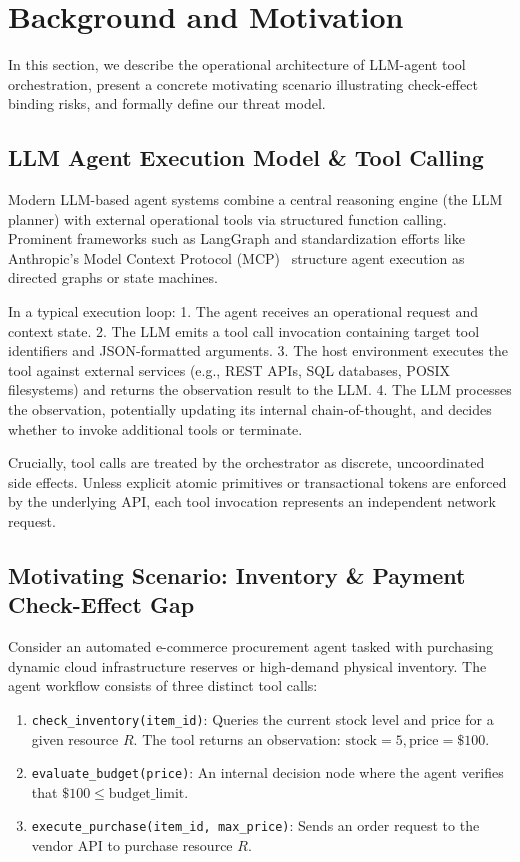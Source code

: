 \section{Background and Motivation}
\label{sec:background}

In this section, we describe the operational architecture of LLM-agent tool orchestration, present a concrete motivating scenario illustrating check-effect binding risks, and formally define our threat model.

\subsection{LLM Agent Execution Model \& Tool Calling}
Modern LLM-based agent systems combine a central reasoning engine (the LLM planner) with external operational tools via structured function calling. Prominent frameworks such as LangGraph and standardization efforts like Anthropic's Model Context Protocol (MCP)~\cite{mcp2024spec} structure agent execution as directed graphs or state machines. 

In a typical execution loop:
1. The agent receives an operational request and context state.
2. The LLM emits a tool call invocation containing target tool identifiers and JSON-formatted arguments.
3. The host environment executes the tool against external services (e.g., REST APIs, SQL databases, POSIX filesystems) and returns the observation result to the LLM.
4. The LLM processes the observation, potentially updating its internal chain-of-thought, and decides whether to invoke additional tools or terminate.

Crucially, tool calls are treated by the orchestrator as discrete, uncoordinated side effects. Unless explicit atomic primitives or transactional tokens are enforced by the underlying API, each tool invocation represents an independent network request.

\subsection{Motivating Scenario: Inventory \& Payment Check-Effect Gap}
Consider an automated e-commerce procurement agent tasked with purchasing dynamic cloud infrastructure reserves or high-demand physical inventory. The agent workflow consists of three distinct tool calls:
\begin{enumerate}
    \item \texttt{check\_inventory(item\_id)}: Queries the current stock level and price for a given resource $R$. The tool returns an observation: $\text{stock} = 5, \text{price} = \$100$.
    \item \texttt{evaluate\_budget(price)}: An internal decision node where the agent verifies that $\$100 \le \text{budget\_limit}$.
    \item \texttt{execute\_purchase(item\_id, max\_price)}: Sends an order request to the vendor API to purchase resource $R$.
\end{enumerate}

